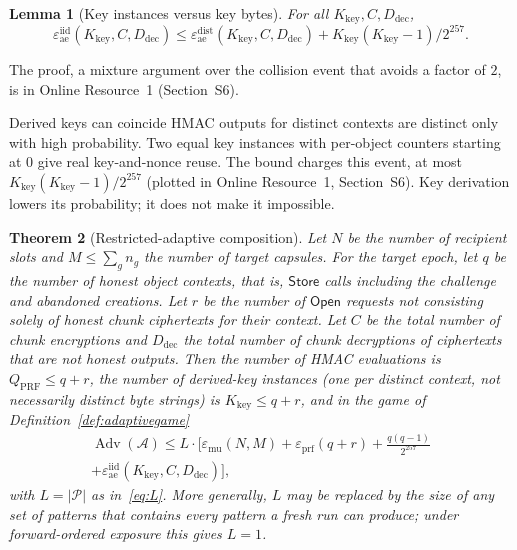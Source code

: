 \documentclass[pdflatex,sn-mathphys-num]{sn-jnl}%
\theoremstyle{plain}
\newtheorem{theorem}{Theorem}
\newtheorem{lemma}[theorem]{Lemma}
\theoremstyle{definition}
\newcommand{\Adv}{\operatorname{Adv}}
\begin{document}
\begin{lemma}[Key instances versus key bytes]\label{lem:keycoll}
For all $K_{\mathrm{key}},C,D_{\mathrm{dec}}$,
\[
 \varepsilon^{\mathrm{iid}}_{\mathrm{ae}}(K_{\mathrm{key}},C,D_{\mathrm{dec}})\le\varepsilon^{\mathrm{dist}}_{\mathrm{ae}}(K_{\mathrm{key}},C,D_{\mathrm{dec}})+K_{\mathrm{key}}(K_{\mathrm{key}}-1)/2^{257}.
\]
\end{lemma}
The proof, a mixture argument over the collision event that avoids a factor of $2$, is in Online Resource~1 (Section~S6).

\begin{warnbox}{Derived keys can coincide}
HMAC outputs for distinct contexts are distinct only with high probability. Two equal key instances with per-object counters starting at $0$ give real key-and-nonce reuse. The bound charges this event, at most $K_{\mathrm{key}}(K_{\mathrm{key}}-1)/2^{257}$ (plotted in Online Resource~1, Section~S6). Key derivation lowers its probability; it does not make it impossible.
\end{warnbox}


\begin{keyresult}
\begin{theorem}[Restricted-adaptive composition]\label{thm:adaptive}
Let $N$ be the number of recipient slots and $M\le\sum_gn_g$ the number of target capsules. For the target epoch, let $q$ be the number of honest object contexts, that is, $\mathsf{Store}$ calls including the challenge and abandoned creations. Let $r$ be the number of $\mathsf{Open}$ requests not consisting solely of honest chunk ciphertexts for their context. Let $C$ be the total number of chunk encryptions and $D_{\mathrm{dec}}$ the total number of chunk decryptions of ciphertexts that are not honest outputs. Then the number of HMAC evaluations is $Q_{\mathrm{PRF}}\le q+r$, the number of derived-key \emph{instances} (one per distinct context, not necessarily distinct byte strings) is $K_{\mathrm{key}}\le q+r$, and in the game of Definition~\ref{def:adaptivegame}
\begin{multline}\label{eq:adaptive}
 \Adv(\mathcal A)\le L\cdot\Big[\varepsilon_{\mathrm{mu}}(N,M)+\varepsilon_{\mathrm{prf}}(q+r)+\frac{q(q-1)}{2^{257}}\\
 +\varepsilon^{\mathrm{iid}}_{\mathrm{ae}}(K_{\mathrm{key}},C,D_{\mathrm{dec}})\Big],
\end{multline}
with $L=|\mathcal P|$ as in~\eqref{eq:L}. More generally, $L$ may be replaced by the size of any set of patterns that contains every pattern a fresh run can produce; under forward-ordered exposure this gives $L=1$.
\end{theorem}
\end{keyresult}
\end{document}

